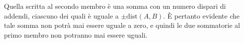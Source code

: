 {Quella scritta al secondo membro è una somma con un numero dispari di addendi, ciascuno dei quali è uguale a $\pm\mathrm{dist}(A,B)$. È pertanto evidente che tale somma non potrà mai essere uguale a zero, e quindi le due sommatorie al primo membro non potranno mai essere uguali.
}

\renewcommand{\SoluzioniAlternative}{}

\renewcommand{\Osservazioni}{\TitoloOsservazione

Si noti che la condizione che i punti richiesti sono distinti è irrilevante nella dimostrazione dell'impossibilità per $n$
dispari.  }

\renewcommand{\Commenti}{
}
